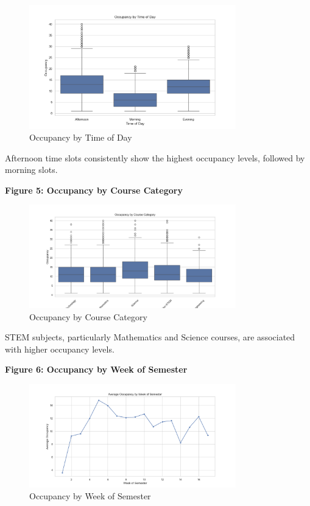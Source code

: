 \documentclass[12pt,letterpaper]{article}
\begin{document}
\begin{figure}[H]
    \centering
    \includegraphics[width=0.8\textwidth]{occupancy_prediction/visualizations/occupancy_by_timebin.png}
    \caption{Occupancy by Time of Day}
\end{figure}

Afternoon time slots consistently show the highest occupancy levels, followed by morning slots.

\textbf{Figure 5: Occupancy by Course Category}

\begin{figure}[H]
    \centering
    \includegraphics[width=0.8\textwidth]{occupancy_prediction/visualizations/occupancy_by_course.png}
    \caption{Occupancy by Course Category}
\end{figure}

STEM subjects, particularly Mathematics and Science courses, are associated with higher occupancy levels.

\textbf{Figure 6: Occupancy by Week of Semester}

\begin{figure}[H]
    \centering
    \includegraphics[width=0.8\textwidth]{occupancy_prediction/visualizations/occupancy_by_week.png}
    \caption{Occupancy by Week of Semester}
\end{figure}
\end{document}

